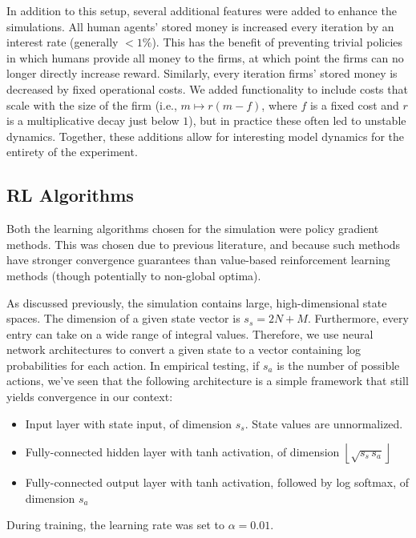 \documentclass[twoside,twocolumn]{article}
\begin{document}
\medskip

In addition to this setup, several additional features were added to enhance the simulations. All human agents' stored money is increased every iteration by an interest rate (generally $<1\%$). This has the benefit of preventing trivial policies in which humans provide all money to the firms, at which point the firms can no longer directly increase reward. Similarly, every iteration firms' stored money is decreased by fixed operational costs. We added functionality to include costs that scale with the size of the firm (i.e., $m \mapsto r(m - f)$, where $f$ is a fixed cost and $r$ is a multiplicative decay just below $1$), but in practice these often led to unstable dynamics. Together, these additions allow for interesting model dynamics for the entirety of the experiment.


\subsection{RL Algorithms}
Both the learning algorithms chosen for the simulation were policy gradient methods. This was chosen due to previous literature, and because such methods have stronger convergence guarantees than value-based reinforcement learning methods (though potentially to non-global optima).

\medskip

As discussed previously, the simulation contains large, high-dimensional state spaces. The dimension of a given state vector is $s_s = 2 N + M$. Furthermore, every entry can take on a wide range of integral values. Therefore, we use neural network architectures to convert a given state to a vector containing log probabilities for each action. In empirical testing, if $s_a$ is the number of possible actions, we've seen that the following architecture is a simple framework that still yields convergence in our context:
\begin{itemize}
  \item Input layer with state input, of dimension $s_s$. State values are unnormalized.
  \item Fully-connected hidden layer with tanh activation, of dimension $\left\lfloor \sqrt{s_s \, s_a} \right\rfloor$
  \item Fully-connected output layer with tanh activation, followed by log softmax, of dimension $s_a$
\end{itemize}
During training, the learning rate was set to $\alpha = 0.01$. 
\end{document}
